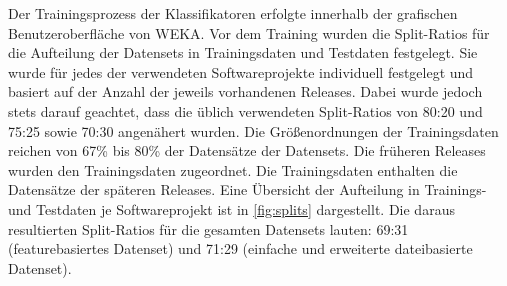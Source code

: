 Der Trainingsprozess der Klassifikatoren erfolgte innerhalb der grafischen Benutzeroberfläche von WEKA. Vor dem Training wurden die Split-Ratios für die Aufteilung der Datensets in Trainingsdaten und Testdaten festgelegt. Sie wurde für jedes der verwendeten Softwareprojekte individuell festgelegt und basiert auf der Anzahl der jeweils vorhandenen Releases. Dabei wurde jedoch stets darauf geachtet, dass die üblich verwendeten Split-Ratios von 80:20 und 75:25 sowie 70:30 angenähert wurden. Die Größenordnungen der Trainingsdaten reichen von 67\% bis 80\% der Datensätze der Datensets. Die früheren Releases wurden den Trainingsdaten zugeordnet. Die Trainingsdaten enthalten die Datensätze der späteren Releases. Eine Übersicht der Aufteilung in Trainings- und Testdaten je Softwareprojekt ist in \autoref{fig:splits} dargestellt. Die daraus resultierten Split-Ratios für die gesamten Datensets lauten: 69:31 (featurebasiertes Datenset) und 71:29 (\glqq einfache\grqq{} und erweiterte dateibasierte Datenset).

